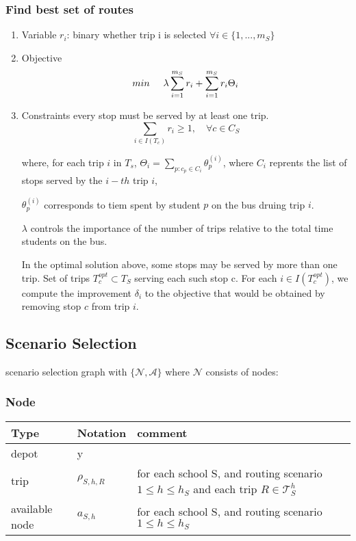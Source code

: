 \documentclass[11pt]{article}
\begin{document}
\subsubsection{Find best set of routes}
\label{sec:org7c4c3fe}
\begin{enumerate}
\item Variable
\label{sec:org54dc371}
\(r_i\): binary whether trip i is selected \(\forall i \in \{1,...,m_S\}\)

\item Objective
\label{sec:org693adc9}
$$ min \hspace{0.5cm} \lambda \sum_{i=1}^{m_S} r_i + \sum_{i=1}^{m_S} r_i \Theta_i $$

\item Constraints
\label{sec:org3db8b53}
 every stop must be served by at least one trip. 
$$\sum_{i \in I(T_c)} r_i \ge 1, \quad \forall c \in C_S$$ 

where, for each trip \(i\) in \(T_s\), \(\Theta_i = \sum_{p:c_p \in C_i}
     \theta_p^{(i)}\), where \(C_i\) reprents the list of stops served by the
\(i-th\) trip \(i\),

\(\theta_p^{(i)}\) corresponds to tiem spent by student \(p\) on the bus druing
trip \(i\).

\(\lambda\) controls the importance of the number of trips relative to the
total time students on the bus.

In the optimal solution above, some stops may be served by more than one trip. 
Set of trips \(T_c^{opt} \subset T_S\) serving each such stop c. For each
\(i\in I(T_c^{opt})\), we compute the improvement \(\delta_i\) to the objective
that would be obtained by removing stop \(c\) from trip \(i\).
\end{enumerate}






\subsection{Scenario Selection}
\label{sec:orga54f9ea}
scenario selection graph with \(\{{\mathcal{N},\mathcal{A}\}}\) 
where \(\mathcal{N}\) consists of nodes: 
\subsubsection{Node}
\label{sec:org5fbcf1b}

\begin{center}
\begin{tabular}{lll}
Type & Notation & comment\\
\hline
depot & y & \\
trip & \(\rho_{S,h,R}\) & for each school S, and routing scenario \(1 \le h \le h_S\) and each trip \(R \in \mathcal{T}_S^h\)\\
available node & \(a_{S,h}\) & for each school S, and routing scenario \(1 \le h \le h_S\)\\
\end{tabular}
\end{center}
\end{document}
